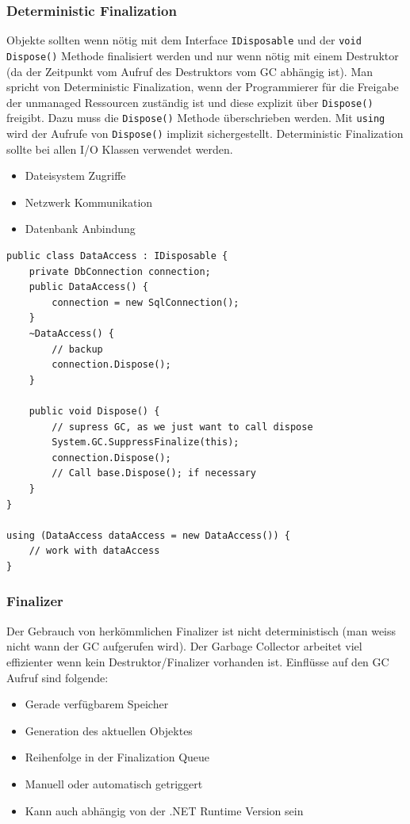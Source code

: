 \subsubsection{Deterministic Finalization} Objekte sollten wenn nötig mit dem Interface \lstinline|IDisposable| und der \lstinline|void Dispose()| Methode finalisiert werden und nur wenn nötig mit einem Destruktor (da der Zeitpunkt vom Aufruf des Destruktors vom GC abhängig ist). Man spricht von Deterministic Finalization, wenn der Programmierer für die Freigabe der unmanaged Ressourcen zuständig ist und diese explizit über \lstinline|Dispose()| freigibt. Dazu muss die \lstinline|Dispose()| Methode überschrieben werden. Mit \lstinline|using| wird der Aufrufe von \lstinline|Dispose()| implizit sichergestellt. Deterministic Finalization sollte bei allen I/O Klassen verwendet werden.
\begin{itemize}
	\item Dateisystem Zugriffe
	\item Netzwerk Kommunikation
	\item Datenbank Anbindung
\end{itemize}

\begin{lstlisting}
public class DataAccess : IDisposable {
	private DbConnection connection;
	public DataAccess() { 
		connection = new SqlConnection();
	}
	~DataAccess() {
		// backup
		connection.Dispose(); 
	}
	
	public void Dispose() {
		// supress GC, as we just want to call dispose
		System.GC.SuppressFinalize(this);
		connection.Dispose();
		// Call base.Dispose(); if necessary
	}
}

using (DataAccess dataAccess = new DataAccess()) {
	// work with dataAccess
}
\end{lstlisting}

\subsubsection{Finalizer} Der Gebrauch von herkömmlichen Finalizer ist nicht deterministisch (man weiss nicht wann der GC aufgerufen wird). Der Garbage Collector arbeitet viel effizienter wenn kein Destruktor/Finalizer vorhanden ist. Einflüsse auf den GC Aufruf sind folgende:
\begin{itemize}
	\item Gerade verfügbarem Speicher
	\item Generation des aktuellen Objektes
	\item Reihenfolge in der Finalization Queue
	\item Manuell oder automatisch getriggert
	\item Kann auch abhängig von der .NET Runtime Version sein
\end{itemize}

